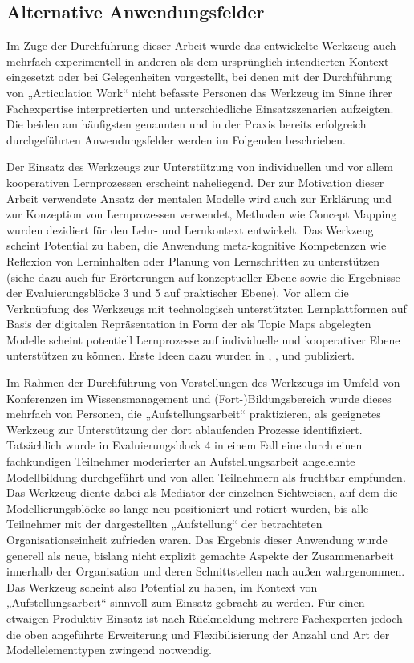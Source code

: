 
\subsection{Alternative Anwendungsfelder} %
\label{sub:alternative_anwendungsfelder}

Im Zuge der Durchführung dieser Arbeit wurde das entwickelte Werkzeug auch mehrfach experimentell in anderen als dem ursprünglich intendierten Kontext eingesetzt oder bei Gelegenheiten vorgestellt, bei denen mit der Durchführung von „Articulation Work“ nicht befasste Personen das Werkzeug im Sinne ihrer Fachexpertise interpretierten und unterschiedliche Einsatzszenarien aufzeigten. Die beiden am häufigsten genannten und in der Praxis bereits erfolgreich durchgeführten Anwendungsfelder werden im Folgenden beschrieben.

Der Einsatz des Werkzeugs zur Unterstützung von individuellen und vor allem kooperativen Lernprozessen erscheint naheliegend. Der zur Motivation dieser Arbeit verwendete Ansatz der mentalen Modelle wird auch zur Erklärung und zur Konzeption von Lernprozessen verwendet, Methoden wie Concept Mapping wurden dezidiert für den Lehr- und Lernkontext entwickelt. Das Werkzeug scheint Potential zu haben, die Anwendung meta-kognitive Kompetenzen wie Reflexion von Lerninhalten oder Planung von Lernschritten zu unterstützen (siehe dazu auch \citep{Oppl10a} für Erörterungen auf konzeptueller Ebene sowie die Ergebnisse der Evaluierungsblöcke 3 und 5 auf praktischer Ebene). Vor allem die Verknüpfung des Werkzeugs mit technologisch unterstützten Lernplattformen auf Basis der digitalen Repräsentation in Form der als Topic Maps abgelegten Modelle scheint potentiell Lernprozesse auf individuelle und kooperativer Ebene unterstützen zu können. Erste Ideen dazu wurden in \citep{Oppl09}, \citep{Oppl09c}, \citep{Oppl09d} und \citep{Neubauer09a} publiziert.

Im Rahmen der Durchführung von Vorstellungen des Werkzeugs im Umfeld von Konferenzen im Wissensmanagement und (Fort-)Bildungsbereich wurde dieses mehrfach von Personen, die „Aufstellungsarbeit“ \citep{Sparrer02} praktizieren, als geeignetes Werkzeug zur Unterstützung der dort ablaufenden Prozesse identifiziert. Tatsächlich wurde in Evaluierungsblock 4 in einem Fall eine durch einen fachkundigen Teilnehmer moderierter an Aufstellungsarbeit angelehnte Modellbildung durchgeführt und von allen Teilnehmern als fruchtbar empfunden. Das Werkzeug diente dabei als Mediator der einzelnen Sichtweisen, auf dem die Modellierungsblöcke so lange neu positioniert und rotiert wurden, bis alle Teilnehmer mit der dargestellten „Aufstellung“ der betrachteten Organisationseinheit zufrieden waren. Das Ergebnis dieser Anwendung wurde generell als neue, bislang nicht explizit gemachte Aspekte der Zusammenarbeit innerhalb der Organisation und deren Schnittstellen nach außen wahrgenommen. Das Werkzeug scheint also Potential zu haben, im Kontext von „Aufstellungsarbeit“ sinnvoll zum Einsatz gebracht zu werden. Für einen etwaigen Produktiv-Einsatz ist nach Rückmeldung mehrere Fachexperten jedoch die oben angeführte Erweiterung und Flexibilisierung der Anzahl und Art der Modellelementtypen zwingend notwendig.


